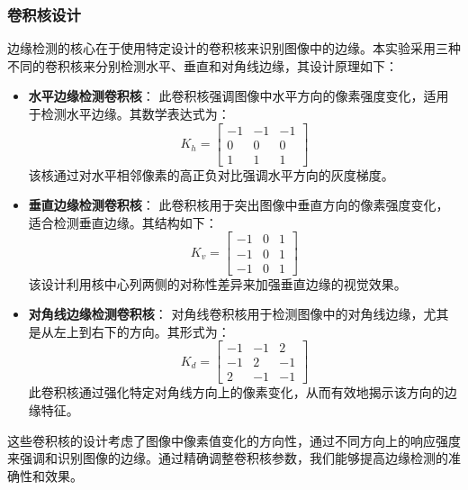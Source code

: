 \documentclass[a4paper,12pt]{article}
\begin{document}
\subsubsection{卷积核设计}
边缘检测的核心在于使用特定设计的卷积核来识别图像中的边缘。本实验采用三种不同的卷积核来分别检测水平、垂直和对角线边缘，其设计原理如下：
\begin{itemize}
	\item \textbf{水平边缘检测卷积核}：
	此卷积核强调图像中水平方向的像素强度变化，适用于检测水平边缘。其数学表达式为：
	\begin{equation}
		K_h = \begin{bmatrix}
			-1 & -1 & -1 \\
			0 &  0 &  0 \\
			1 &  1 &  1
		\end{bmatrix}
	\end{equation}
	该核通过对水平相邻像素的高正负对比强调水平方向的灰度梯度。
	
	\item \textbf{垂直边缘检测卷积核}：
	此卷积核用于突出图像中垂直方向的像素强度变化，适合检测垂直边缘。其结构如下：
	\begin{equation}
		K_v = \begin{bmatrix}
			-1 & 0 & 1 \\
			-1 & 0 & 1 \\
			-1 & 0 & 1
		\end{bmatrix}
	\end{equation}
	该设计利用核中心列两侧的对称性差异来加强垂直边缘的视觉效果。
	
	\item \textbf{对角线边缘检测卷积核}：
	对角线卷积核用于检测图像中的对角线边缘，尤其是从左上到右下的方向。其形式为：
	\begin{equation}
		K_d = \begin{bmatrix}
			-1 & -1 & 2 \\
			-1 &  2 & -1 \\
			2 & -1 & -1
		\end{bmatrix}
	\end{equation}
	此卷积核通过强化特定对角线方向上的像素变化，从而有效地揭示该方向的边缘特征。
\end{itemize}

这些卷积核的设计考虑了图像中像素值变化的方向性，通过不同方向上的响应强度来强调和识别图像的边缘。通过精确调整卷积核参数，我们能够提高边缘检测的准确性和效果。
\end{document}
